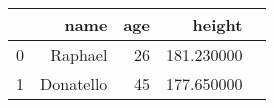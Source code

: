 \begin{tabular}{rrrrr}
\toprule
 & name & age & height \\
\midrule
0 & Raphael & 26 & 181.230000 \\
1 & Donatello & 45 & 177.650000 \\
\bottomrule
\end{tabular}

